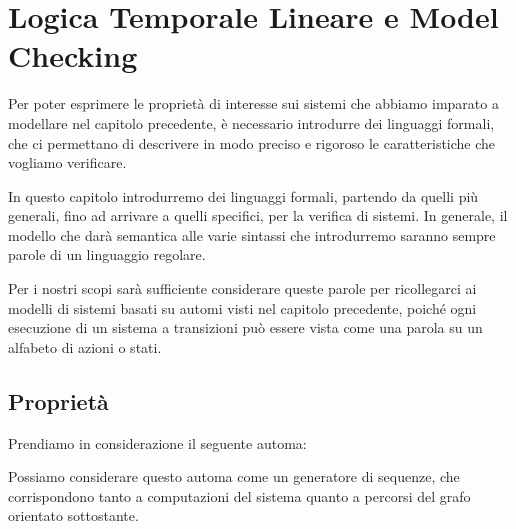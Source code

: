 \chapter{Logica Temporale Lineare e Model Checking}

Per poter esprimere le proprietà di interesse sui sistemi che abbiamo imparato a modellare nel capitolo precedente,
è necessario introdurre dei linguaggi formali, che ci permettano di descrivere in modo preciso e rigoroso le caratteristiche che vogliamo verificare.

In questo capitolo introdurremo dei linguaggi formali, partendo da quelli più generali, fino ad arrivare a quelli specifici, per la verifica di sistemi.
In generale, il modello che darà semantica alle varie sintassi che introdurremo saranno sempre parole di un linguaggio regolare.

Per i nostri scopi sarà sufficiente considerare queste parole per ricollegarci ai modelli di sistemi basati su automi visti nel capitolo precedente, poiché ogni esecuzione di un sistema a transizioni può essere vista come una parola su un alfabeto di azioni o stati.

\section{Proprietà}

Prendiamo in considerazione il seguente automa:

\begin{figure}[h]
  \centering
\end{figure}

Possiamo considerare questo automa come un generatore di sequenze, che corrispondono tanto a computazioni del sistema quanto a percorsi del grafo orientato sottostante.


